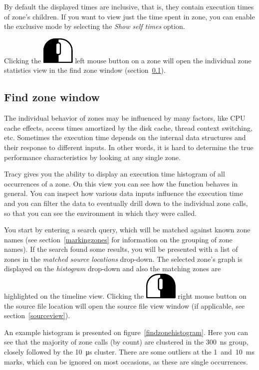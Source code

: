 \documentclass[hidelinks,titlepage,a4paper]{article}
\newcommand{\LMB}{\includegraphics[height=.8\baselineskip]{icons/lmb}}
\newcommand{\RMB}{\includegraphics[height=.8\baselineskip]{icons/rmb}}
\begin{document}
By default the displayed times are inclusive, that is, they contain execution times of zone's children. If you want to view just the time spent in zone, you can enable the exclusive mode by selecting the \emph{\faClock{} Show self times} option.

Clicking the \LMB{} left mouse button on a zone will open the individual zone statistics view in the find zone window (section~\ref{findzone}).

\subsection{Find zone window}
\label{findzone}

The individual behavior of zones may be influenced by many factors, like CPU cache effects, access times amortized by the disk cache, thread context switching, etc. Sometimes the execution time depends on the internal data structures and their response to different inputs. In other words, it is hard to determine the true performance characteristics by looking at any single zone.

Tracy gives you the ability to display an execution time histogram of all occurrences of a zone. On this view you can see how the function behaves in general. You can inspect how various data inputs influence the execution time and you can filter the data to eventually drill down to the individual zone calls, so that you can see the environment in which they were called.

You start by entering a search query, which will be matched against known zone names (see section~\ref{markingzones} for information on the grouping of zone names). If the search found some results, you will be presented with a list of zones in the \emph{matched source locations} drop-down. The selected zone's graph is displayed on the \emph{histogram} drop-down and also the matching zones are highlighted on the timeline view. Clicking the \RMB{} right mouse button on the source file location will open the source file view window (if applicable, see section~\ref{sourceview}).

An example histogram is presented on figure~\ref{findzonehistogram}. Here you can see that the majority of zone calls (by count) are clustered in the 300~\si{\nano\second} group, closely followed by the 10~\si{\micro\second} cluster. There are some outliers at the 1~and~10~\si{\milli\second} marks, which can be ignored on most occasions, as these are single occurrences.
\end{document}
